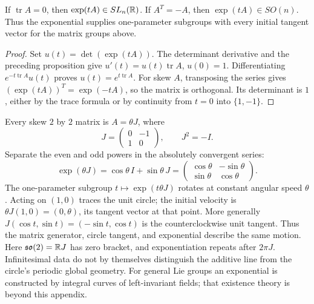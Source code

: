 \begin{proposition}
If $\operatorname{tr}A=0$, then $\exp(tA)\in SL_n(\mathbb{R})$. If $A^T=-A$,
then $\exp(tA)\in SO(n)$. Thus the exponential supplies one-parameter
subgroups with every initial tangent vector for the matrix groups above.
\end{proposition}
\begin{proof}
Set $u(t)=\det(\exp(tA))$. The determinant derivative and the preceding
proposition give $u'(t)=u(t)\operatorname{tr}A$, $u(0)=1$.
Differentiating $e^{-t\operatorname{tr}A}u(t)$ proves
$u(t)=e^{t\operatorname{tr}A}$. For skew $A$, transposing the series gives
$(\exp(tA))^T=\exp(-tA)$, so the matrix is orthogonal. Its determinant is $1$,
either by the trace formula or by continuity from $t=0$ into $\{1,-1\}$.
\end{proof}
\begin{example}
Every skew $2$ by $2$ matrix is $A=\theta J$, where
\[
J=\begin{pmatrix}0&-1\\1&0\end{pmatrix},\qquad J^2=-I.
\]
Separate the even and odd powers in the absolutely convergent series:
\[
\exp(\theta J)=\cos\theta\,I+\sin\theta\,J
=\begin{pmatrix}\cos\theta&-\sin\theta\\
\sin\theta&\cos\theta\end{pmatrix}.
\]
The one-parameter subgroup $t\mapsto \exp(t\theta J)$ rotates at constant
angular speed $\theta$. Acting on $(1,0)$ traces the unit circle;
the initial velocity is $\theta J(1,0)=(0,\theta)$, its tangent vector
at that point. More generally $J(\cos t,\sin t)=(-\sin t,\cos t)$
is the counterclockwise unit tangent. Thus the matrix generator, circle
tangent, and exponential describe the same motion. Here $\mathfrak{so}(2)=\mathbb{R} J$ has zero bracket,
and exponentiation repeats after $2\pi J$. Infinitesimal data do not by
themselves distinguish the additive line from the circle's periodic global
geometry. For general Lie groups an exponential is constructed by integral
curves of left-invariant fields; that existence theory is beyond this appendix.
\end{example}

\par{}
